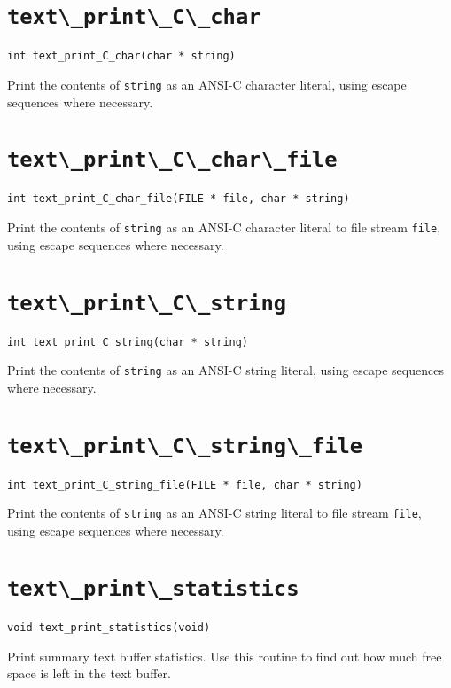 \section{\protect\verb+text\_print\_C\_char+}
\begin{verbatim}
int text_print_C_char(char * string)
\end{verbatim}
Print the contents of {\tt string} as an ANSI-C character literal, 
using escape sequences where necessary.

\section{\protect\verb+text\_print\_C\_char\_file+}
\begin{verbatim}
int text_print_C_char_file(FILE * file, char * string)
\end{verbatim}
Print the contents of {\tt string} as an ANSI-C character literal to file
stream {\tt file}, 
using escape sequences where necessary.

\section{\protect\verb+text\_print\_C\_string+}
\begin{verbatim}
int text_print_C_string(char * string)
\end{verbatim}
Print the contents of {\tt string} as an ANSI-C string literal, 
using escape sequences where necessary.

\section{\protect\verb+text\_print\_C\_string\_file+}
\begin{verbatim}
int text_print_C_string_file(FILE * file, char * string)
\end{verbatim}
Print the contents of {\tt string} as an ANSI-C string literal to file
stream {\tt file}, 
using escape sequences where necessary.

\section{\protect\verb+text\_print\_statistics+}
\begin{verbatim}
void text_print_statistics(void)
\end{verbatim}
Print summary text buffer statistics. Use this routine to find out how
much free space is left in the text buffer.

